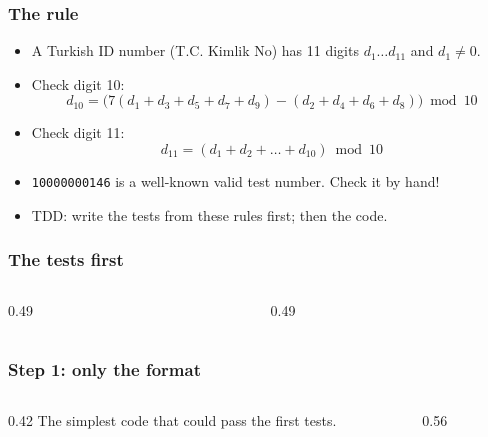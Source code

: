 \documentclass[aspectratio=169,10pt,compress]{beamer}
\begin{document}
\begin{frame}[t,fragile] \frametitle{The rule}
  \begin{itemize}
    \item A Turkish ID number (T.C. Kimlik No) has 11 digits $d_{1} \dots d_{11}$ and $d_{1} \neq 0$.
    \item Check digit 10:
          \[
          	d_{10} = \big( 7 (d_{1} + d_{3} + d_{5} + d_{7} + d_{9}) - (d_{2} + d_{4} + d_{6} + d_{8}) \big) \bmod 10
          \]
    \item Check digit 11:
          \[
          	d_{11} = (d_{1} + d_{2} + \dots + d_{10}) \bmod 10
          \]
    \item \texttt{10000000146} is a well-known valid test number. Check it by hand!
    \item TDD: write the tests from these rules first; then the code.
  \end{itemize}
\end{frame}




\begin{frame}[t,fragile] \frametitle{The tests first}
  \begin{columns}[T]
    \begin{column}{0.49\textwidth}
    \end{column}
    \begin{column}{0.49\textwidth}
    \end{column}
  \end{columns}
\end{frame}




\begin{frame}[t,fragile] \frametitle{Step 1: only the format}
  \begin{columns}[T]
    \begin{column}{0.42\textwidth}
      \small The simplest code that could pass the first tests.
    \end{column}
    \begin{column}{0.56\textwidth}
    \end{column}
  \end{columns}
\end{frame}
\end{document}
